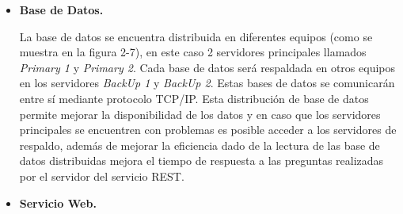 \documentclass{memoria}
\begin{document}
\newpage
\begin{itemize}
\item \textbf{Base de Datos.}


La base de datos se encuentra distribuida en diferentes equipos (como se muestra en la figura 2-7), en este caso 2 servidores principales llamados \textsl{Primary 1} y \textsl{Primary 2}. Cada base de datos será respaldada en otros equipos en los servidores \textsl{BackUp 1} y \textsl{BackUp 2}. Estas bases de datos se comunicarán entre sí mediante protocolo TCP/IP. Esta distribución de base de datos permite mejorar la disponibilidad de los datos y en caso que los servidores principales se encuentren con problemas es posible acceder a los servidores de respaldo, además de mejorar la eficiencia dado de la lectura de las base de datos distribuidas mejora el tiempo de respuesta a las preguntas realizadas por el servidor del servicio REST.

\newpage
\item \textbf{Servicio Web.}


\end{itemize}
\end{document}
